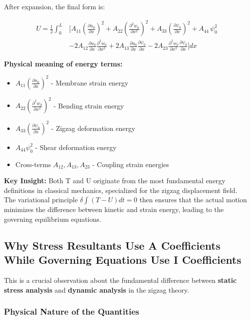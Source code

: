 \documentclass[12pt,a4paper]{article}
\begin{document}
After expansion, the final form is:

\begin{align}
U = \frac{1}{2} \int_0^L &\Bigg[
A_{11} \left(\frac{\partial u_0}{\partial x}\right)^2
+ A_{22} \left(\frac{\partial^2 w_0}{\partial x^2}\right)^2
+ A_{33} \left(\frac{\partial \psi_0}{\partial x}\right)^2
+ A_{44} \, \psi_0^2 \nonumber \\[6pt]
&- 2A_{12} \frac{\partial u_0}{\partial x} \frac{\partial^2 w_0}{\partial x^2}
+ 2A_{13} \frac{\partial u_0}{\partial x} \frac{\partial \psi_0}{\partial x}
- 2A_{23} \frac{\partial^2 w_0}{\partial x^2} \frac{\partial \psi_0}{\partial x}
\Bigg] dx
\end{align}

\textbf{Physical meaning of energy terms:}
\begin{itemize}
\item $A_{11}(\frac{\partial u_0}{\partial x})^2$ - Membrane strain energy
\item $A_{22}(\frac{\partial^2 w_0}{\partial x^2})^2$ - Bending strain energy
\item $A_{33}(\frac{\partial \psi_0}{\partial x})^2$ - Zigzag deformation energy
\item $A_{44}\psi_0^2$ - Shear deformation energy
\item Cross-terms $A_{12}, A_{13}, A_{23}$ - Coupling strain energies
\end{itemize}

\textbf{Key Insight:} Both T and U originate from the most fundamental energy definitions in classical mechanics, specialized for the zigzag displacement field. The variational principle $\delta \int (T-U)dt = 0$ then ensures that the actual motion minimizes the difference between kinetic and strain energy, leading to the governing equilibrium equations.

\subsection{Why Stress Resultants Use A Coefficients While Governing Equations Use I Coefficients}

This is a crucial observation about the fundamental difference between \textbf{static stress analysis} and \textbf{dynamic analysis} in the zigzag theory.

\subsubsection{Physical Nature of the Quantities}
\end{document}
